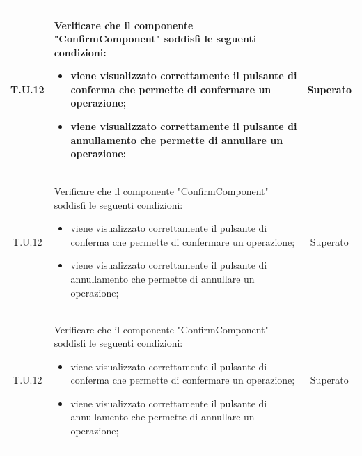 \begin{tabularx}{\textwidth}{|c|X|c|}
    \hline
    \label{tu:tu37}T.U.12 & Verificare che il componente "ConfirmComponent" soddisfi le seguenti condizioni: 
    \begin{itemize}
        \item viene visualizzato correttamente il pulsante di conferma che permette di confermare un operazione;
        \item viene visualizzato correttamente il pulsante di annullamento che permette di annullare un operazione;
    \end{itemize}
    & Superato \\
    \hline
    \label{tu:tu37}T.U.12 & Verificare che il componente "ConfirmComponent" soddisfi le seguenti condizioni: 
    \begin{itemize}
        \item viene visualizzato correttamente il pulsante di conferma che permette di confermare un operazione;
        \item viene visualizzato correttamente il pulsante di annullamento che permette di annullare un operazione;
    \end{itemize}
    & Superato \\
    \hline
    \label{tu:tu37}T.U.12 & Verificare che il componente "ConfirmComponent" soddisfi le seguenti condizioni: 
    \begin{itemize}
        \item viene visualizzato correttamente il pulsante di conferma che permette di confermare un operazione;
        \item viene visualizzato correttamente il pulsante di annullamento che permette di annullare un operazione;
    \end{itemize}
    & Superato \\
    \hline
\end{tabularx}